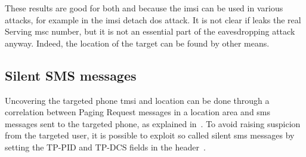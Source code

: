       These results are good for both  and 
      because the \gls{imsi} can be used in various attacks, for example
      in the \gls{imsi} detach \gls{dos} attack. It is not clear if
       leaks the real Serving \gls{msc} number, but it is
      not an essential part of the eavesdropping attack anyway. Indeed,
      the location of the target can be found by other means.

      \iffalse

      Telenor, no problem. +4791xxxx85
      IMSI 242013977953009/24201311xxxxx91 clearly random
      serving msc 479000213040191 seems ok but louche
      serving hlr 4790000947 seems ok
      The imsi changes with each request, but the serving stay the same

      Proximus roaming netcom, no problem +32477646158
      206012220938542 / 20601xxxx938542
      serving msc 4792003990
      serving hlr 32477646158
      stays the same with each request

      Proximus netcom +32479xxxx15
      206012219452575/206012219452575  
      serving msc 4792002001 seems stable
      serving hlr 32479755215

      Chess (MVNO netcom), +47471xxxx5 (virtual operator can have different stuff…)
      query: 24202747143405 (fake but not random) true: 24202560xxxx342
      4792001019 constant, seems ok
      4792001032 (increments…)

      Base roaming telenor
      2062094588440 / 2062010xxxx9724 (with xt5 get 2060100)
      4741713899 xt5
      32494588440 (with xt5 get 324860)
      \fi

    \subsection{Silent SMS messages}
    \label{sec:silent_sms}

      Uncovering the targeted phone \gls{tmsi} and location can be done
      through a correlation between Paging Request messages in a
      location area and \gls{sms} messages sent to the targeted phone,
      as explained in~. To avoid raising
      suspicion from the targeted user, it is possible to exploit so
      called silent \gls{sms} messages by setting the TP-PID and TP-DCS
      fields in the header~\cite[p.~53]{3gpp_ts_2001}.
      
